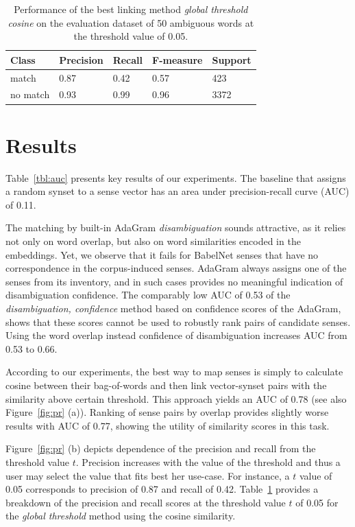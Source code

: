 \documentclass[10pt, a4paper]{article}
\begin{document}
\begin{table}
\centering
\label{my-label}
\begin{tabular}{lllll}
       \bf Class  & \bf Precision & \bf Recall & \bf F-measure & \bf Support \\ \hline
match    & 0.87      & 0.42   & 0.57      & 423     \\
no match & 0.93      & 0.99   & 0.96      & 3372   
\end{tabular}
\caption{Performance of the best linking method \textit{global threshold cosine} on the evaluation dataset of 50 ambiguous words at the threshold value of 0.05.}
\label{tbl:results2}

\end{table}


\section{Results}

Table~\ref{tbl:auc} presents key results of our experiments. The baseline that assigns a random synset to a sense vector has an area under precision-recall curve (AUC) of 0.11.

The matching by built-in AdaGram \textit{disambiguation} sounds attractive, as it relies not only on word overlap, but also on word similarities encoded in the embeddings. Yet, we  observe that it fails for BabelNet senses that have no correspondence in the corpus-induced senses. AdaGram always assigns one of the senses from its inventory, and in such cases provides no meaningful indication of disambiguation confidence. The comparably low AUC of 0.53 of the \textit{disambiguation, confidence} method based on confidence scores of the AdaGram, shows that these scores cannot be used to robustly rank pairs of candidate senses. Using the word overlap instead confidence of disambiguation increases AUC from 0.53 to 0.66. 

According to our experiments, the best way to map senses is simply to calculate cosine between their bag-of-words and then link vector-synset pairs with the similarity above certain threshold. This approach yields an AUC of 0.78 (see also Figure~\ref{fig:pr} (a)). Ranking of sense pairs by overlap provides slightly worse results with AUC of 0.77, showing the utility of similarity scores in this task.

Figure~\ref{fig:pr} (b) depicts dependence of the precision and recall from the threshold value $t$. Precision increases with the value of the threshold and thus a user may select the value that fits best her use-case. For instance, a $t$ value of 0.05 corresponds to precision of 0.87 and recall of 0.42. Table~\ref{tbl:results2} provides a breakdown of the precision and recall scores at the threshold value $t$ of 0.05 for the \textit{global threshold} method using the cosine similarity.  
\end{document}
